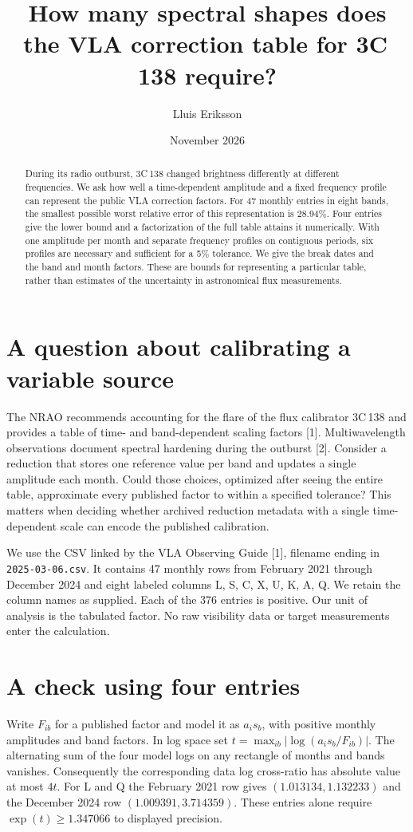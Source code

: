 \documentclass[10pt]{article}
\title{How many spectral shapes does the VLA correction table for 3C\,138 require?}
\author{Lluis Eriksson}
\date{November 2026}
\begin{document}
\maketitle
\begin{abstract}
During its radio outburst, 3C\,138 changed brightness differently at different frequencies. We ask how well a time-dependent amplitude and a fixed frequency profile can represent the public VLA correction factors. For 47 monthly entries in eight bands, the smallest possible worst relative error of this representation is 28.94\%. Four entries give the lower bound and a factorization of the full table attains it numerically. With one amplitude per month and separate frequency profiles on contiguous periods, six profiles are necessary and sufficient for a 5\% tolerance. We give the break dates and the band and month factors. These are bounds for representing a particular table, rather than estimates of the uncertainty in astronomical flux measurements.
\end{abstract}
\section{A question about calibrating a variable source}
The NRAO recommends accounting for the flare of the flux calibrator 3C\,138 and provides a table of time- and band-dependent scaling factors [1]. Multiwavelength observations document spectral hardening during the outburst [2]. Consider a reduction that stores one reference value per band and updates a single amplitude each month. Could those choices, optimized after seeing the entire table, approximate every published factor to within a specified tolerance? This matters when deciding whether archived reduction metadata with a single time-dependent scale can encode the published calibration.

We use the CSV linked by the VLA Observing Guide [1], filename ending in \texttt{2025-03-06.csv}. It contains 47 monthly rows from February 2021 through December 2024 and eight labeled columns L, S, C, X, U, K, A, Q. We retain the column names as supplied. Each of the 376 entries is positive. Our unit of analysis is the tabulated factor. No raw visibility data or target measurements enter the calculation.

\section{A check using four entries}
Write $F_{ib}$ for a published factor and model it as $a_i s_b$, with positive monthly amplitudes and band factors. In log space set $t=\max_{ib}|\log(a_i s_b/F_{ib})|$. The alternating sum of the four model logs on any rectangle of months and bands vanishes. Consequently the corresponding data log cross-ratio has absolute value at most $4t$. For L and Q the February 2021 row gives $(1.013134,1.132233)$ and the December 2024 row $(1.009391,3.714359)$. These entries alone require $\exp(t)\geq 1.347066$ to displayed precision.
\end{document}
